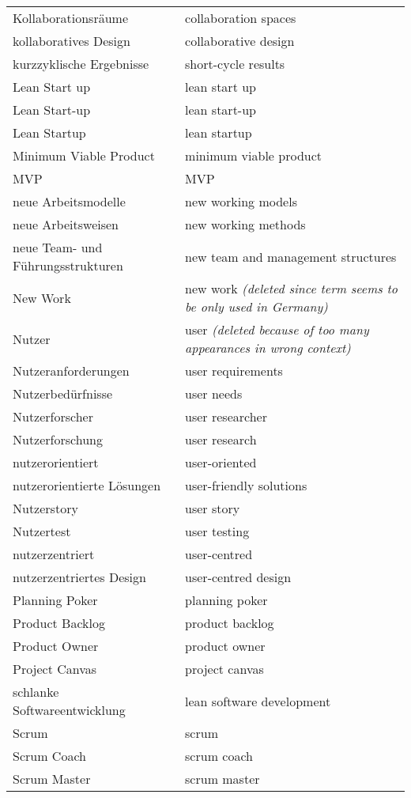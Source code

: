 \begin{spacing}{.5}
\begin{longtable}{ p{} p{}}
    Kollaborationsräume & collaboration spaces \\
    kollaboratives Design & collaborative design \\
    kurzzyklische Ergebnisse & short-cycle results \\
    Lean Start up & lean start up \\
    Lean Start-up & lean start-up \\
    Lean Startup & lean startup \\
    Minimum Viable Product & minimum viable product \\
    MVP & MVP \\
    neue Arbeitsmodelle & new working models \\
    neue Arbeitsweisen & new working methods \\
    neue Team- und Führungsstrukturen & new team and management structures \\
    New Work & new work \textit{(deleted since term seems to be only used in Germany)}\\
    Nutzer & user \textit{(deleted because of too many appearances in wrong context)} \\
    Nutzeranforderungen & user requirements \\
    Nutzerbedürfnisse & user needs \\
    Nutzerforscher & user researcher \\
    Nutzerforschung & user research \\
    nutzerorientiert & user-oriented \\
    nutzerorientierte Lösungen & user-friendly solutions \\
    Nutzerstory & user story \\
    Nutzertest & user testing \\
    nutzerzentriert & user-centred \\
    nutzerzentriertes Design & user-centred design \\
    Planning Poker & planning poker \\
    Product Backlog & product backlog \\
    Product Owner & product owner \\
    Project Canvas & project canvas \\
    schlanke Softwareentwicklung & lean software development \\
    Scrum & scrum \\
    Scrum Coach & scrum coach \\
    Scrum Master & scrum master \\

\end{longtable}
\end{spacing}
